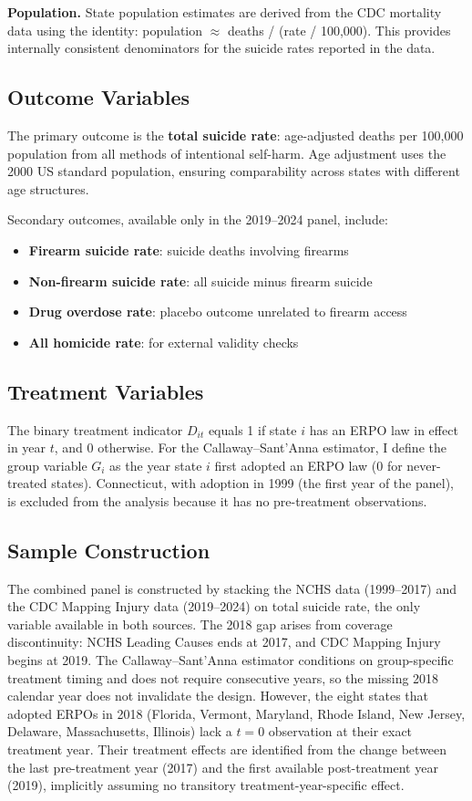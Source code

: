 \documentclass[12pt]{article}
\begin{document}
\textbf{Population.} State population estimates are derived from the CDC mortality data using the identity: population $\approx$ deaths / (rate / 100,000). This provides internally consistent denominators for the suicide rates reported in the data.

\subsection{Outcome Variables}

The primary outcome is the \textbf{total suicide rate}: age-adjusted deaths per 100,000 population from all methods of intentional self-harm. Age adjustment uses the 2000 US standard population, ensuring comparability across states with different age structures.

Secondary outcomes, available only in the 2019--2024 panel, include:
\begin{itemize}
\item \textbf{Firearm suicide rate}: suicide deaths involving firearms
\item \textbf{Non-firearm suicide rate}: all suicide minus firearm suicide
\item \textbf{Drug overdose rate}: placebo outcome unrelated to firearm access
\item \textbf{All homicide rate}: for external validity checks
\end{itemize}

\subsection{Treatment Variables}

The binary treatment indicator $D_{it}$ equals 1 if state $i$ has an ERPO law in effect in year $t$, and 0 otherwise. For the Callaway--Sant'Anna estimator, I define the group variable $G_i$ as the year state $i$ first adopted an ERPO law (0 for never-treated states). Connecticut, with adoption in 1999 (the first year of the panel), is excluded from the analysis because it has no pre-treatment observations.

\subsection{Sample Construction}
\label{sec:sample_construction}

The combined panel is constructed by stacking the NCHS data (1999--2017) and the CDC Mapping Injury data (2019--2024) on total suicide rate, the only variable available in both sources. The 2018 gap arises from coverage discontinuity: NCHS Leading Causes ends at 2017, and CDC Mapping Injury begins at 2019. The Callaway--Sant'Anna estimator conditions on group-specific treatment timing and does not require consecutive years, so the missing 2018 calendar year does not invalidate the design. However, the eight states that adopted ERPOs in 2018 (Florida, Vermont, Maryland, Rhode Island, New Jersey, Delaware, Massachusetts, Illinois) lack a $t = 0$ observation at their exact treatment year. Their treatment effects are identified from the change between the last pre-treatment year (2017) and the first available post-treatment year (2019), implicitly assuming no transitory treatment-year-specific effect.
\end{document}
